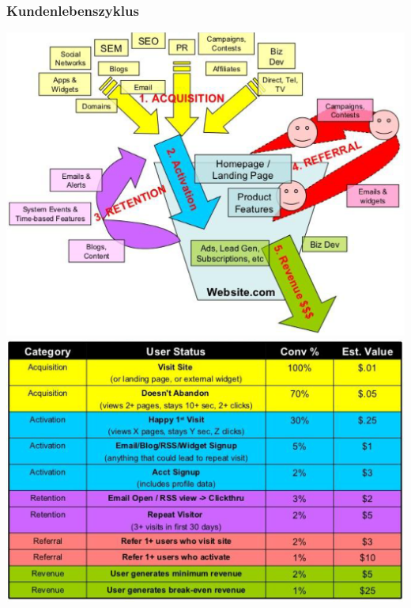 \subsubsection{Kundenlebenszyklus}
\begin{multicols}{2}
	\includegraphics[width=1\linewidth]{images/kundenlebenszyklus}
	\includegraphics[width=1\linewidth]{images/kundenlebenszyklus_2}
\end{multicols}